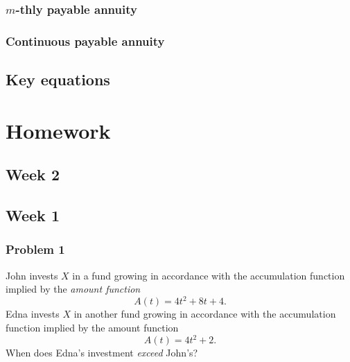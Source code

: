 \documentclass[
]{book}
\begin{document}
\hypertarget{m-thly-payable-annuity}{%
\subsection*{\texorpdfstring{\(m\)-thly payable annuity}{m-thly payable annuity}}\label{m-thly-payable-annuity}}

\hypertarget{continuous-payable-annuity}{%
\subsection*{Continuous payable annuity}\label{continuous-payable-annuity}}

\hypertarget{key-equations}{%
\section{Key equations}\label{key-equations}}

\hypertarget{homework}{%
\chapter*{Homework}\label{homework}}

\hypertarget{week-2}{%
\section*{Week 2}\label{week-2}}

\hypertarget{week-1}{%
\section*{Week 1}\label{week-1}}

\hypertarget{problem-1}{%
\subsection*{Problem 1}\label{problem-1}}

John invests \(X\) in a fund growing in accordance with the accumulation function implied by the \emph{amount function}
\[A(t)=4t^2+8t+4.\]
Edna invests \(X\) in another fund growing in accordance with the accumulation function implied by the amount function \[A(t)=4t^2+2.\]
When does Edna's investment \emph{exceed} John's?
\end{document}

